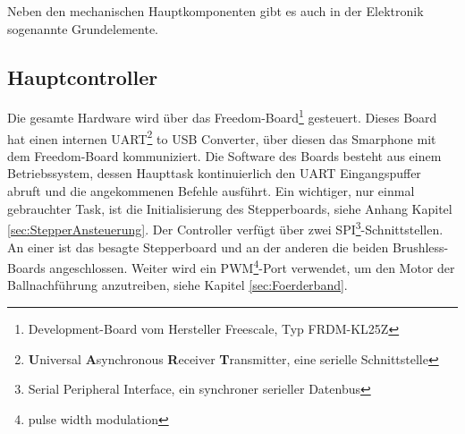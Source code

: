 		Neben den mechanischen Hauptkomponenten gibt es auch in der Elektronik sogenannte Grundelemente. 
		
    \subsection{Hauptcontroller}
    	
        Die gesamte Hardware wird über das Freedom-Board\footnote{Development-Board vom 
        Hersteller Freescale, Typ FRDM-KL25Z} gesteuert. Dieses Board hat einen internen UART\footnote{\textbf{U}niversal \textbf{A}synchronous \textbf{R}eceiver 
        \textbf{T}ransmitter, eine serielle Schnittstelle} to USB Converter, über diesen 
        das Smarphone mit dem Freedom-Board kommuniziert. Die Software des Boards besteht aus einem 
        Betriebssystem, dessen Haupttask kontinuierlich den UART Eingangspuffer abruft 
        und die angekommenen Befehle ausführt. Ein wichtiger, nur einmal gebrauchter Task, 
        ist die Initialisierung des Stepperboards, siehe Anhang Kapitel \ref{sec:StepperAnsteuerung}. Der Controller 
        verfügt über zwei SPI\footnote{Serial Peripheral Interface, ein synchroner serieller Datenbus }-Schnittstellen. An einer ist das besagte Stepperboard und 
        an der anderen die beiden Brushless-Boards angeschlossen. Weiter wird ein PWM\footnote{pulse width modulation}-Port 
        verwendet, um den Motor der Ballnachführung anzutreiben, siehe Kapitel 
        \ref{sec:Foerderband}.  

   
